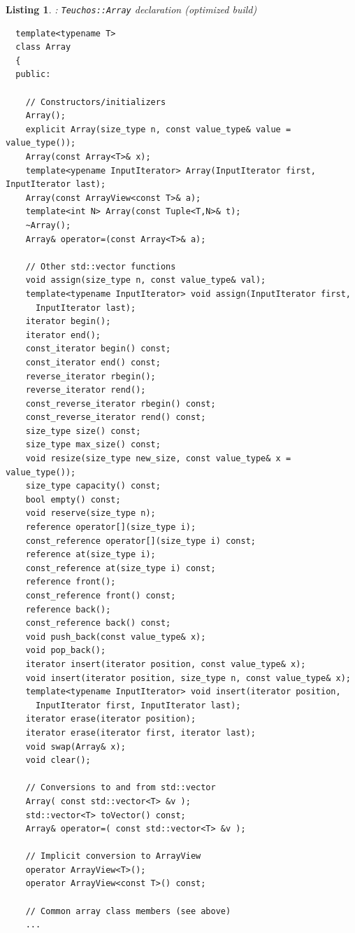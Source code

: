 \documentclass[pdf,ps2pdf,11pt]{SANDreport}
\newtheorem{listing}{Listing}
\begin{document}
\begin{listing}: {}\texttt{Teuchos::Array} declaration (optimized build) \\
\label{listing:Array}
{\small\begin{verbatim}
  template<typename T>
  class Array
  {
  public:
  
    // Constructors/initializers
    Array();
    explicit Array(size_type n, const value_type& value = value_type());
    Array(const Array<T>& x);
    template<ypename InputIterator> Array(InputIterator first, InputIterator last);
    Array(const ArrayView<const T>& a);
    template<int N> Array(const Tuple<T,N>& t);
    ~Array();
    Array& operator=(const Array<T>& a);
  
    // Other std::vector functions
    void assign(size_type n, const value_type& val);
    template<typename InputIterator> void assign(InputIterator first,
      InputIterator last);
    iterator begin();
    iterator end();
    const_iterator begin() const;
    const_iterator end() const;
    reverse_iterator rbegin();
    reverse_iterator rend();
    const_reverse_iterator rbegin() const;
    const_reverse_iterator rend() const;
    size_type size() const;
    size_type max_size() const;
    void resize(size_type new_size, const value_type& x = value_type());
    size_type capacity() const;
    bool empty() const;
    void reserve(size_type n);
    reference operator[](size_type i);
    const_reference operator[](size_type i) const;
    reference at(size_type i);
    const_reference at(size_type i) const;
    reference front();
    const_reference front() const;
    reference back();
    const_reference back() const;
    void push_back(const value_type& x);
    void pop_back();
    iterator insert(iterator position, const value_type& x);
    void insert(iterator position, size_type n, const value_type& x);
    template<typename InputIterator> void insert(iterator position,
      InputIterator first, InputIterator last);
    iterator erase(iterator position);
    iterator erase(iterator first, iterator last);
    void swap(Array& x);
    void clear();
  
    // Conversions to and from std::vector
    Array( const std::vector<T> &v );
    std::vector<T> toVector() const;
    Array& operator=( const std::vector<T> &v );

    // Implicit conversion to ArrayView
    operator ArrayView<T>();
    operator ArrayView<const T>() const;
  
    // Common array class members (see above)
    ...
  

\end{verbatim}}
\end{listing}
\end{document}
